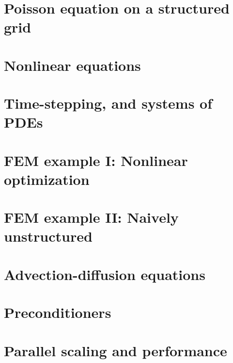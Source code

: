\documentclass{tufte-book}
\newcommand{\CODELOC}{}  %
\newcommand{\stubinput}[2]{}
\newcommand{\stubinput}[2]{\vspace{5cm} \centerline{\LARGE Percent completed:  \Huge #2\%.} \vfill}
\theoremstyle{definition}
\begin{document}
\chapter{Poisson equation on a structured grid}
\label{chap:st}
\renewcommand{\CODELOC}{ch3/}


\chapter{Nonlinear equations}
\label{chap:nl}
\renewcommand{\CODELOC}{ch4/}


\chapter{Time-stepping, and systems of PDEs}
\label{chap:ts}
\renewcommand{\CODELOC}{ch5/}


\chapter{FEM example I: Nonlinear optimization}
\label{chap:of}
\renewcommand{\CODELOC}{ch6/}


\chapter{FEM example II: Naively unstructured}
\label{chap:un}
\renewcommand{\CODELOC}{ch7/}


\chapter{Advection-diffusion equations}
\label{chap:ad}
\renewcommand{\CODELOC}{ch8/}
\stubinput{chaps/advdif.tex}{20}
%

\chapter{Preconditioners}
\label{chap:pr}
\renewcommand{\CODELOC}{ch9/}
\stubinput{chaps/precond.tex}{10}
%

\chapter{Parallel scaling and performance}
\label{chap:sc}
\renewcommand{\CODELOC}{ch10/}
\stubinput{chaps/scaling.tex}{5}
%
\end{document}
